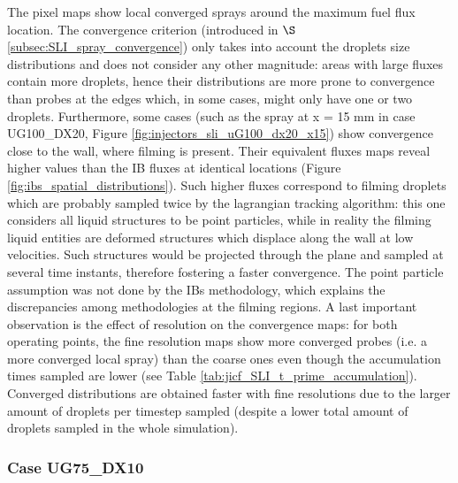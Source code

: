 The pixel maps show local converged sprays around the maximum fuel flux location. The convergence criterion (introduced in $\S$\ref{subsec:SLI_spray_convergence}) only takes into account the droplets size distributions and does not consider any other magnitude: areas with large fluxes contain more droplets, hence their distributions are more prone to convergence than probes at the edges which, in some cases, might only have one or two droplets. Furthermore, some cases (such as the spray at x = 15 mm in case UG100\_DX20, Figure \ref{fig:injectors_sli_uG100_dx20_x15}) show convergence close to the wall, where filming is present. Their equivalent fluxes maps reveal higher values than the IB fluxes at identical locations (Figure \ref{fig:ibs_spatial_distributions}). Such higher fluxes correspond to filming droplets which are probably sampled twice by the lagrangian tracking algorithm: this one considers all liquid structures to be point particles, while in reality the filming liquid entities are deformed structures which displace along the wall at low velocities. Such structures would be projected through the plane and sampled at several time instants, therefore fostering a faster convergence. The point particle assumption was not done by the IBs methodology, which explains the discrepancies among methodologies at the filming regions. A last important observation is the effect of resolution on the convergence maps: for both operating points, the fine resolution maps show more converged probes (i.e. a more converged local spray) than the coarse ones even though the accumulation times sampled are lower (see Table \ref{tab:jicf_SLI_t_prime_accumulation}). Converged distributions are obtained faster with fine resolutions due to the larger amount of droplets per timestep sampled (despite a lower total amount of droplets sampled in the whole simulation). 

\clearpage


\subsubsection*{Case UG75\_DX10}






